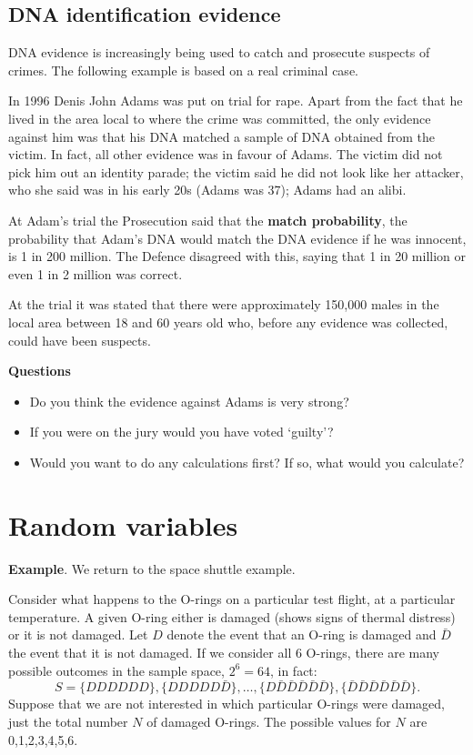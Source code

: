 \documentclass[
  11pt,
  british,
  openany, a4paper]{book}
\providecommand{\tightlist}{%
  \setlength{\itemsep}{0pt}\setlength{\parskip}{0pt}}
\begin{document}
\hypertarget{dna-identification-evidence}{%
\section{DNA identification evidence}\label{dna-identification-evidence}}

DNA evidence is increasingly being used to catch and prosecute suspects of crimes. The following example is based on a real criminal case.

In 1996 Denis John Adams was put on trial for rape. Apart from the fact that he lived in the area local to where the crime was committed, the only evidence against him was that his DNA matched a sample of DNA obtained from the victim.
In fact, all other evidence was in favour of Adams. The victim did not pick him out an identity parade; the victim said he did not look like her attacker, who she said was in his early 20s (Adams was 37); Adams had an alibi.

At Adam's trial the Prosecution said that the \textbf{match probability}, the probability that Adam's DNA would match the DNA evidence if he was innocent, is 1 in 200 million. The Defence disagreed with this, saying that 1 in 20 million or even 1 in 2 million was correct.

At the trial it was stated that there were approximately 150,000 males in the local area between 18 and 60 years old who, before any evidence was collected, could have been suspects.

\textbf{Questions}

\begin{itemize}
\tightlist
\item
  Do you think the evidence against Adams is very strong?
\item
  If you were on the jury would you have voted `guilty'?
\item
  Would you want to do any calculations first? If so, what would you calculate?
\end{itemize}

\hypertarget{rvs}{%
\chapter{Random variables}\label{rvs}}

\textbf{Example}. We return to the space shuttle example.

Consider what happens to the O-rings on a particular test flight, at a particular temperature. A given O-ring either is damaged (shows signs of thermal distress) or it is not damaged. Let \(D\) denote the event that an O-ring is damaged and \(\bar{D}\) the event that it is not damaged. If we consider all 6 O-rings, there are many possible outcomes in the sample space, \(2^6=64\), in fact:
\[ S= \{DDDDDD\}, \{DDDDD\bar{D}\}, \ldots, \{D\bar{D}\bar{D}\bar{D}\bar{D}\bar{D}\}, 
\{\bar{D}\bar{D}\bar{D}\bar{D}\bar{D}\bar{D}\}. \]
Suppose that we are not interested in which particular O-rings were damaged, just the total number \(N\) of damaged O-rings. The possible values for \(N\) are 0,1,2,3,4,5,6.
\end{document}
